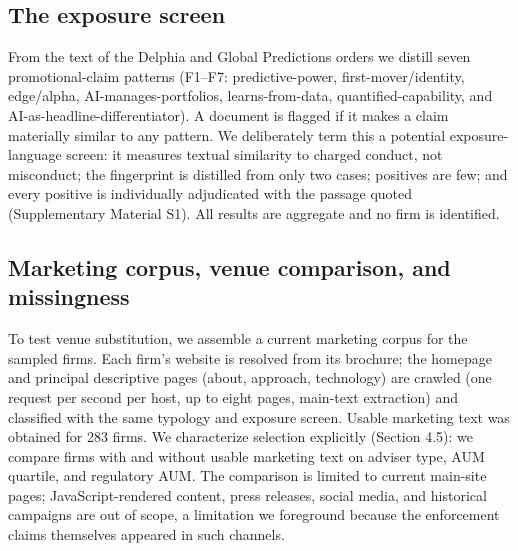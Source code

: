 \documentclass[utf8]{FrontiersinHarvard}
\begin{document}
\subsection{The exposure screen}
From the text of the Delphia and Global Predictions orders we distill seven promotional-claim patterns (F1--F7: predictive-power, first-mover/identity, edge/alpha, AI-manages-portfolios, learns-from-data, quantified-capability, and AI-as-headline-differentiator). A document is flagged if it makes a claim materially similar to any pattern. We deliberately term this a potential exposure-language screen: it measures textual similarity to charged conduct, not misconduct; the fingerprint is distilled from only two cases; positives are few; and every positive is individually adjudicated with the passage quoted (Supplementary Material S1). All results are aggregate and no firm is identified.

\subsection{Marketing corpus, venue comparison, and missingness}
To test venue substitution, we assemble a current marketing corpus for the sampled firms. Each firm's website is resolved from its brochure; the homepage and principal descriptive pages (about, approach, technology) are crawled (one request per second per host, up to eight pages, main-text extraction) and classified with the same typology and exposure screen. Usable marketing text was obtained for 283 firms. We characterize selection explicitly (Section 4.5): we compare firms with and without usable marketing text on adviser type, AUM quartile, and regulatory AUM. The comparison is limited to current main-site pages; JavaScript-rendered content, press releases, social media, and historical campaigns are out of scope, a limitation we foreground because the enforcement claims themselves appeared in such channels.
\end{document}
